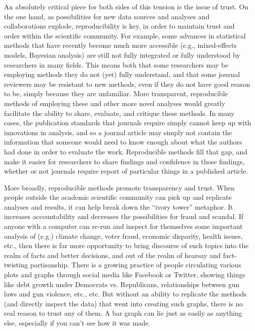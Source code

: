 \documentclass{book}
\begin{document}
An absolutely critical piece for both sides of this tension is the issue of trust.  On the one hand, as possibilities for new data sources and analyses and collaborations explode, reproducibility is key, in order to maintain trust and order within the scientific community.  For example, some advances in statistical methods that have recently become much more accessible (e.g., mixed-effects models, Bayesian analysis) are still not fully integrated or fully understood by researchers in many fields.  This means both that some researchers may be employing methods they do not (yet) fully understand, and that some journal reviewers may be resistant to new methods, even if they do not have good reason to be, simply because they are unfamiliar. More transparent, reproducible methods of employing these and other more novel analyses would greatly facilitate the ability to share, evaluate, and critique these methods. In many cases, the publication standards that journals require simply cannot keep up with innovations in analysis, and so a journal article may simply not contain the information that someone would need to know enough about what the authors had done in order to evaluate the work. Reproducible methods fill that gap, and make it easier for researchers to share findings and confidence in those findings, whether or not journals require report of particular things in a published article.

More broadly, reproducible methods promote transparency and trust.  When people outside the academic scientific community can pick up and replicate analyses and results, it can help break down the ``ivory tower'' metaphor.  It increases accountability and decreases the possibilities for fraud and scandal. If anyone with a computer can re-run and inspect for themselves some important analysis of (e.g.) climate change, voter fraud, economic disparity, health issues, etc., then there is far more opportunity to bring discourse of such topics into the realm of facts and better decisions, and out of the realm of hearsay and fact-twisting partisanship.  There is a growing practice of people circulating various plots and graphs through social media like Facebook or Twitter, showing things like debt growth under Democrats vs. Republicans, relationships between gun laws and gun violence, etc., etc.  But without an ability to replicate the methods (and directly inspect the data) that went into creating such graphs, there is no real reason to trust any of them.  A bar graph can lie just as easily as anything else, especially if you can't see how it was made. 
\end{document}
